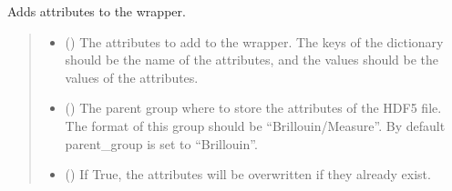 \documentclass[letterpaper,10pt,english]{sphinxmanual}
\begin{document}
\begin{fulllineitems}
\begin{fulllineitems}
\end{fulllineitems}


\begin{fulllineitems}
\label{\detokenize{source/_autosummary/HDF5_BLS.Wrapper:HDF5_BLS.Wrapper.add_attributes}}
\pysigstartsignatures
\pysiglinewithargsret
{}
{\sphinxparamcomma {}\sphinxparamcomma {}}
{}
\pysigstopsignatures
\sphinxAtStartPar
Adds attributes to the wrapper.
\begin{quote}\begin{description}
\begin{itemize}
\item {} 
\sphinxAtStartPar
{} () \textendash{} The attributes to add to the wrapper. The keys of the dictionary should be the name of the attributes, and the values should be the values of the attributes.

\item {} 
\sphinxAtStartPar
{} (\sphinxstyleliteralemphasis{\sphinxupquote{, }}) \textendash{} The parent group where to store the attributes of the HDF5 file. The format of this group should be “Brillouin/Measure”. By default parent\_group is set to “Brillouin”.

\item {} 
\sphinxAtStartPar
{} (\sphinxstyleliteralemphasis{\sphinxupquote{, }}) \textendash{} If True, the attributes will be overwritten if they already exist.

\end{itemize}

\end{description}\end{quote}

\end{fulllineitems}


\end{fulllineitems}
\end{document}
